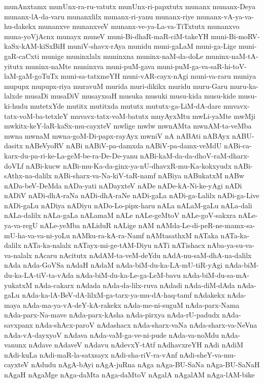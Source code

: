 {munAnxtamx
munUnx-ra-ru-vatutx
munUnx-ri-papxtutx
munanx
munanx-Deya
munanx-lA-da-varu
munanxlilx
munanx-ri-yanu
munanx-riye
munanx-vA-ya-va-hu-dakekx
munanxve
munanxveV
munanx-ve-ya-La-va-TiTxtutx
munanxvo
muna-yoVjAcnx
munayx
muneV
muni-Bi-dhaR-maR-ciM-takeYH
muni-Bi-moRV-kaSx-kAM-kiSxBiH
muniV-shavx-rAya
munidu
muni-gaLaM
muni-ga-Lige
muni-gaR-caCxti
munige
muninxlalx
muninxna
muninx-naM-da-doLe
muninx-naM-tA-yitutx
muninx-naMte
muninxva
muni-puM-gava
muni-puM-ga-va-saR-hi-toV-laM-gaM-goTuTx
muni-sa-tatxmeYH
muni-vAR-cayx-nAgi
muni-va-raru
muniya
mupupx
mupupx-riya
muravuM
murida
muri-dikikx
muridu
muru-Garu
muru-ka-lalxde
musaDi
musaDiV
musayxsaH
musuka
musuki
musu-kida
musu-kide
musu-ki-hudu
mutetxYde
mutitx
mutitxda
mututx
mututx-ga-LiM-dA-dare
muvavx-tatx-voM-ba-tetxleY
muvavx-tatx-voM-batutx
muyAyxMtu
mwLi-yaMte
mwMji
mwkitx-keY-laR-kaSx-mu-cayxteV
mwlige
mwlw
mwnAMta
mwnAM-ta-veMba
mwna
mwnaM
mwna-goM-Di-papx-rayAyx
mwniV
nA
nABAti
nABAyx
nABU-dasitx
nABeVyoRV
nABi
nABiV-pa-damxda
nABiV-pa-damx-veMdU
nABi-ca-karx-du-pa-ri-ke-La-geM-be-ra-De-De-yanu
nABi-kaM-da-da-dhoV-raM-dharx-doVLf
nABi-kucw
nABi-mu-Ka-da-ginx-ya-nU-dhavxR-mu-Ka-kokxyudx
nABi-sAthx-na-dalilx
nABi-sharx-va-Na-kiV-taR-namf
nABiya
nABukatxM
nABw
nADa-beV-DeMda
nADa-yati
nADayxteV
nADe
nADe-kA-Ni-ke-yAgi
nADi
nADiV
nADi-dhA-raNa
nADi-dhA-raNe
nADi-gaLa
nADi-ga-Lalilx
nADi-ga-Live
nADi-gaLu
nADiya
nADiyu
nADo-Lo-pipx-haru
nALa
nALaM-gaLu
nALa-dali
nALa-dalilx
nALa-gaLa
nALamaM
nALe
nALe-geMtoV
nALe-goV-sakxra
nALe-ya-va-regU
nALe-yeMba
nALiduR
nALige
nAM
nAMda-Le-di-peR-ne-mamx-sa-mU-ha-va-va-ni-yoLu
nAMku-ra-kA-ra-Namf
nAMtasathxM
nATaka
nATa-ka-dalilx
nATa-ka-nalalx
nATayx-mi-ge-tAM-Diyu
nATi
nATishacx
nAba-ya-su-va-va-nalalx
nAcaru
nAcitutx
nAdAM-ta-veM-deYdu
nAdA-nu-saM-dhA-na-dalilx
nAda
nAda-GoVSa
nAdaH
nAdaM
nAda-biM-du-ka-LA-mU-tiR-yAgi
nAda-biM-du-ka-LA-tiV-ta-vAda
nAda-biM-du-ka-Le-ga-LeM-bavu
nAda-biM-du-sa-mA-yukatxM
nAda-cakarx
nAdada
nAda-da-lilx-ruva
nAdadi
nAda-diM-dAda
nAda-gaLu
nAda-ka-lA-BeV-dA-lilxM-ga-tarx-ya-mu-dA-haq-tamf
nAdakekx
nAda-maya
nAda-ma-ya-vA-deY-kA-rakekx
nAda-me-ni-suguM
nAda-parx-Nama
nAda-parx-Na-mave
nAda-parx-kAsha
nAda-pirxya
nAda-rU-padudx
nAda-savxpanx
nAda-shAcx-paroV
nAdashacx
nAda-sharx-vaNa
nAda-sharx-va-NeVna
nAda-vA-dayxyoV
nAdava
nAda-vaM-ga-ve-ni-pude
nAda-va-noMdu
nAda-vanunx
nAdave
nAdaveV
nAdavu
nAdevxY-tAtf
nAdhavxreYH
nAdi
nAdiM
nAdi-kuLa
nAdi-maR-la-satxsayx
nAdi-sha-riV-ra-vAnf
nAdi-sheY-va-mu-cayxteV
nAdudu
nAgA-bAyi
nAgA-juRna
nAga
nAga-BU-SaNa
nAga-BU-SaNaH
nAgaH
nAgaMge
nAga-daMta
nAga-daMtoV
nAgalA
nAgalAM
nAga-lAM-bike
}
